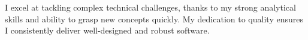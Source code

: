 \documentclass[9pt]{developercv} %
\begin{document}
\vspace{0.5cm}



\begin{minipage}[t]{0.4\textwidth} %
	\vspace{-\baselineskip} %
	
I excel at tackling complex technical challenges, thanks to my strong analytical skills and ability to grasp new concepts quickly.  My dedication to quality ensures I consistently deliver well-designed and robust software.
\end{minipage}
\hfill %
\begin{minipage}[t]{0.5\textwidth} %
	\vspace{-\baselineskip} %
	\begin{barchart}{5.5}
	\end{barchart}
\end{minipage}



\end{document}
